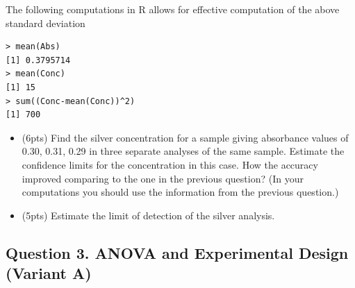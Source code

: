 \documentclass[a4paper,12pt]{article}
\begin{document}
The following computations in R allows for effective computation of the above standard deviation

\begin{framed}
\begin{verbatim}
> mean(Abs)
[1] 0.3795714
> mean(Conc)
[1] 15
> sum((Conc-mean(Conc))^2)
[1] 700
\end{verbatim}
\end{framed}
\begin{itemize}
\item (6pts) Find the silver concentration for a sample giving absorbance values of 0.30, 0.31, 0.29 in three
separate analyses of the same sample. Estimate the confidence limits for the concentration in
this case. How the accuracy improved comparing to the one in the previous question? (In your
computations you should use the information from the previous question.)
\item (5pts) Estimate the limit of detection of the silver analysis.
\end{itemize}
\newpage
\subsection*{Question 3. ANOVA and Experimental Design (Variant A)}

\end{document}
